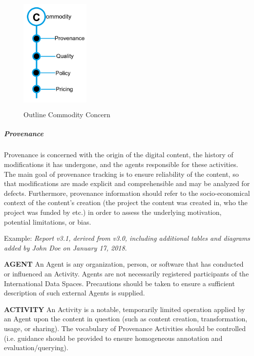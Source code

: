 \begin{figure}[H]
	\begin{Center}
		\includegraphics[width=1.34in,height=2.33in]{./media/image43.png}
		\caption{Outline Commodity Concern}
		\label{fig:outline_commodity_concern}
	\end{Center}
\end{figure}


\subparagraph*{Provenance}
Provenance is concerned with the origin of the digital content, the history of modifications it has undergone, and the agents responsible for these activities. The main goal of provenance tracking is to ensure reliability of the content, so that modifications are made explicit and comprehensible and may be analyzed for defects. Furthermore, provenance information should refer to the socio-economical context of the content’s creation (the project the content was created in, who the project was funded by etc.) in order to assess the underlying motivation, potential limitations, or bias. 

Example: \textit{Report v3.1, derived from v3.0, including additional tables and diagrams added by John Doe on January 17, 2018}.



\textbf{AGENT} An Agent is any organization, person, or software that has conducted or influenced an Activity. Agents are not necessarily registered participants of the International Data Spaces. Precautions should be taken to ensure a sufficient description of such external Agents is supplied.

\textbf{ACTIVITY} An Activity is a notable, temporarily limited operation applied by an Agent upon the content in question (such as content creation, transformation, usage, or sharing). The vocabulary of Provenance Activities should be controlled (i.e. guidance should be provided to ensure homogeneous annotation and evaluation/querying).


